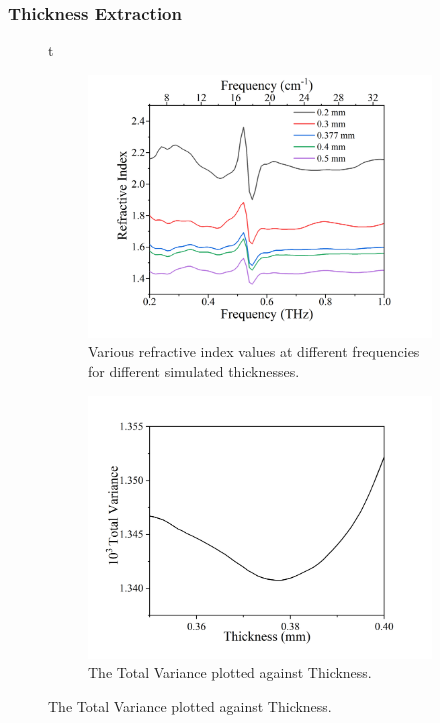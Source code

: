 \subsubsection{Thickness Extraction}
\label{subsubsec:thickness}
\begin{figure}{t} 
\centering

\begin{subfigure}{0.49\textwidth}
\centering
\includegraphics[width=\textwidth]{Figures/Misc/Theory/ThicknessEffectonN.png}
\caption{Various refractive index values at different frequencies for different simulated thicknesses.}
\label{fig:thicknesseffect}
\end{subfigure}
\begin{subfigure}{0.49\textwidth}
\centering
\includegraphics[width=\textwidth]{Figures/Misc/Theory/ThicknessExtraction.png}
\caption{The Total Variance plotted against Thickness.}
\label{fig:thicknessextraction}
\end{subfigure}


\end{figure}
